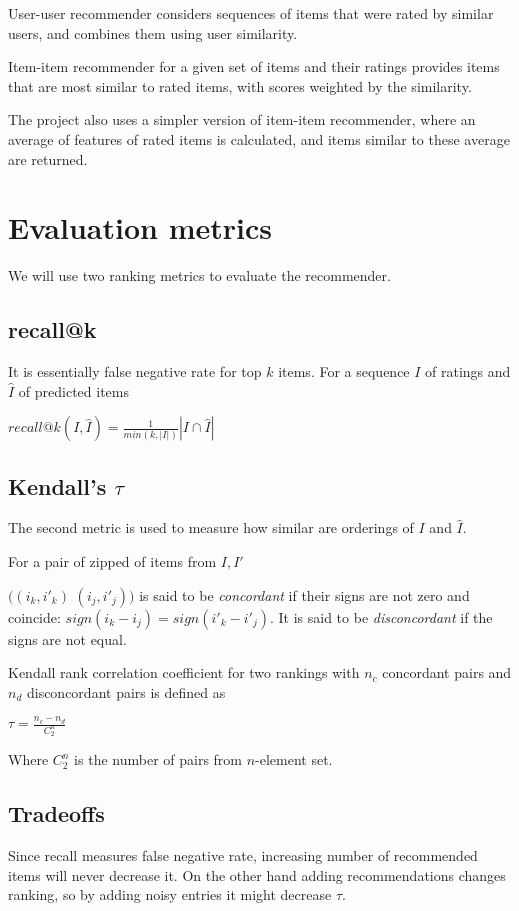 \documentclass{article}
\begin{document}
User-user recommender considers sequences of items that were rated by similar users, and combines them using user similarity.

Item-item recommender for a given set of items and their ratings provides items that are most similar to rated items, with scores weighted by the similarity.

The project also uses a simpler version of item-item recommender, where an average of features of rated items is calculated, and items similar to these average are returned.

\section{Evaluation metrics}

We will use two ranking metrics to evaluate the recommender.

\subsection{recall@k}
It is  essentially false negative rate for top $k$ items. For a sequence $I$ of ratings and $\hat{I}$ of predicted items 

$recall@k(I, \hat{I}) = \frac{1}{min(k, |I|)}|I \cap \hat{I}| $

\subsection{Kendall's $\tau$}
The second metric is used to measure how similar are orderings of $I$ and $\hat{I}$.

For a pair of zipped of items from $I, I'$

$((i_k, i'_k)$ $(i_j, i'_j))$ is said to be \textit{concordant} if their signs are not zero and coincide: $sign(i_k -  i_j) = sign(i'_k - i'_j)$. It is said to be \textit{disconcordant} if the signs are not equal.

Kendall rank correlation coefficient for two rankings with $n_c$ concordant pairs and $n_d$ disconcordant pairs is defined as

$\tau = \frac{n_c - n_d}{C^n_2}$

Where $C^n_2$ is the number of pairs from $n$-element set.

\subsection{Tradeoffs}

Since recall measures false negative rate, increasing number of recommended items will never decrease it. On the other hand adding recommendations changes ranking, so by adding noisy entries it might decrease $\tau$.
\end{document}
